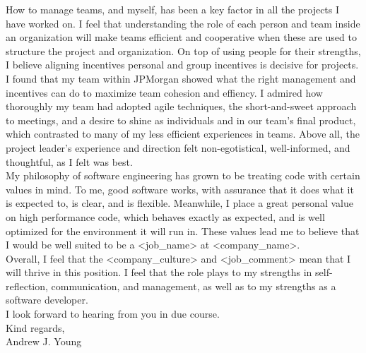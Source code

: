 \documentclass{article}
\begin{document}
How to manage teams, and myself, has been a key factor in all the projects I
have worked on. I feel that understanding the role of each person and team
inside an organization will make teams efficient and cooperative when these are
used to structure the project and organization. On top of using people for
their strengths, I believe aligning incentives personal and group incentives is
decisive for projects. I found that my team within JPMorgan showed what the
right management and incentives can do to maximize team cohesion and effiency.
I admired how thoroughly my team had adopted agile techniques, the
short-and-sweet approach to meetings, and a desire to shine as individuals and
in our team's final product, which contrasted to many of my less efficient
experiences in teams. Above all, the project leader's experience and direction
felt non-egotistical, well-informed, and thoughtful, as I felt was best.\\

My philosophy of software engineering has grown to be treating code with
certain values in mind. To me, good software works, with assurance that it does
what it is expected to, is clear, and is flexible. Meanwhile, I place a great
personal value on high performance code, which behaves exactly as expected, and
is well optimized for the environment it will run in. These values lead me to
believe that I would be well suited to be a <job\_name> at <company\_name>.\\

Overall, I feel that the <company\_culture> and <job\_comment> mean that I will
thrive in this position. I feel that the role plays to my strengths in self-
reflection, communication, and management, as well as to my strengths as a
software developer.\\

I look forward to hearing from you in due course.\\

Kind regards,\\

Andrew J. Young\\
\end{document}
